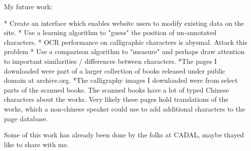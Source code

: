 
    My future work:
        
        *  Create an interface which enables website users to modify existing data on the site.
        *  Use a learning algorithm to "guess" the position of un-annotated characters.
        *  OCR performance on calligraphic characters is abysmal.  Attack this problem
        *  Use a comparison algorithm to "measure" and perhaps draw attention to important similarities / differences between characters.
        *The pages I downloaded were part of a larger collection of books released under public domain at archive.org.
        *The calligraphy images I downloaded were from select parts of the scanned books.  The scanned books have a lot of typed Chinese characters about the works.  Very likely these pages hold translations of the works, which a non-chinese speaker could use to add additional characters to the page database.

    Some of this work has already been done by the folks at CADAL, maybe thayed like to share with me.
